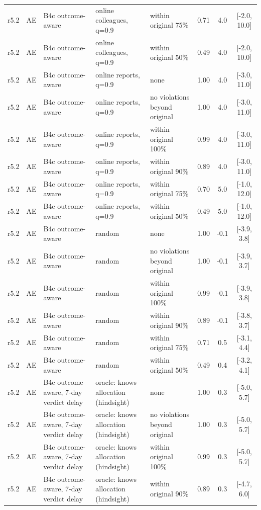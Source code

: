 \documentclass[10pt,onecolumn,letterpaper]{article}
\begin{document}
\begin{longtable}{lllp{4.2cm}p{3.4cm}ccc}
r5.2 & AE & B4c outcome-aware & online colleagues, q=0.9 & within original 75\% & 0.71 & 4.0 & [-2.0, 10.0] \\
r5.2 & AE & B4c outcome-aware & online colleagues, q=0.9 & within original 50\% & 0.49 & 4.0 & [-2.0, 10.0] \\
r5.2 & AE & B4c outcome-aware & online reports, q=0.9 & none & 1.00 & 4.0 & [-3.0, 11.0] \\
r5.2 & AE & B4c outcome-aware & online reports, q=0.9 & no violations beyond original & 1.00 & 4.0 & [-3.0, 11.0] \\
r5.2 & AE & B4c outcome-aware & online reports, q=0.9 & within original 100\% & 0.99 & 4.0 & [-3.0, 11.0] \\
r5.2 & AE & B4c outcome-aware & online reports, q=0.9 & within original 90\% & 0.89 & 4.0 & [-3.0, 11.0] \\
r5.2 & AE & B4c outcome-aware & online reports, q=0.9 & within original 75\% & 0.70 & 5.0 & [-1.0, 12.0] \\
r5.2 & AE & B4c outcome-aware & online reports, q=0.9 & within original 50\% & 0.49 & 5.0 & [-1.0, 12.0] \\
r5.2 & AE & B4c outcome-aware & random & none & 1.00 & -0.1 & [-3.9, 3.8] \\
r5.2 & AE & B4c outcome-aware & random & no violations beyond original & 1.00 & -0.1 & [-3.9, 3.7] \\
r5.2 & AE & B4c outcome-aware & random & within original 100\% & 0.99 & -0.1 & [-3.9, 3.8] \\
r5.2 & AE & B4c outcome-aware & random & within original 90\% & 0.89 & -0.1 & [-3.8, 3.7] \\
r5.2 & AE & B4c outcome-aware & random & within original 75\% & 0.71 & 0.5 & [-3.1, 4.4] \\
r5.2 & AE & B4c outcome-aware & random & within original 50\% & 0.49 & 0.4 & [-3.2, 4.1] \\
r5.2 & AE & B4c outcome-aware, 7-day verdict delay & oracle: knows allocation (hindsight) & none & 1.00 & 0.3 & [-5.0, 5.7] \\
r5.2 & AE & B4c outcome-aware, 7-day verdict delay & oracle: knows allocation (hindsight) & no violations beyond original & 1.00 & 0.3 & [-5.0, 5.7] \\
r5.2 & AE & B4c outcome-aware, 7-day verdict delay & oracle: knows allocation (hindsight) & within original 100\% & 0.99 & 0.3 & [-5.0, 5.7] \\
r5.2 & AE & B4c outcome-aware, 7-day verdict delay & oracle: knows allocation (hindsight) & within original 90\% & 0.89 & 0.3 & [-4.7, 6.0] \\

\end{longtable}
\end{document}
